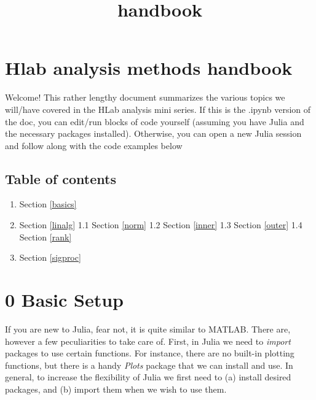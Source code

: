 \documentclass[11pt]{article}
\title{handbook}
\providecommand{\tightlist}{%
      \setlength{\itemsep}{0pt}\setlength{\parskip}{0pt}}
\begin{document}
    
    
    \maketitle
    
    

    
    \hypertarget{hlab-analysis-methods-handbook}{%
\section{Hlab analysis methods
handbook}\label{hlab-analysis-methods-handbook}}

Welcome! This rather lengthy document summarizes the various topics we
will/have covered in the HLab analysis mini series. If this is the
.ipynb version of the doc, you can edit/run blocks of code yourself
(assuming you have Julia and the necessary packages installed).
Otherwise, you can open a new Julia session and follow along with the
code examples below

    \hypertarget{table-of-contents}{%
\subsection{Table of contents}\label{table-of-contents}}

\begin{enumerate}
\def\labelenumi{\arabic{enumi}.}
\setcounter{enumi}{-1}
\tightlist
\item
  Section \ref{basics}
\item
  Section \ref{linalg} 1.1 Section \ref{norm} 1.2 Section \ref{inner}
  1.3 Section \ref{outer} 1.4 Section \ref{rank}
\item
  Section \ref{sigproc}
\end{enumerate}

    \hypertarget{basic-setup}{%
\section{0 Basic Setup }\label{basic-setup}}

If you are new to Julia, fear not, it is quite similar to MATLAB. There
are, however a few peculiarities to take care of. First, in Julia we
need to \emph{import} packages to use certain functions. For instance,
there are no built-in plotting functions, but there is a handy
\emph{Plots} package that we can install and use. In general, to
increase the flexibility of Julia we first need to (a) install desired
packages, and (b) import them when we wish to use them.
\end{document}
